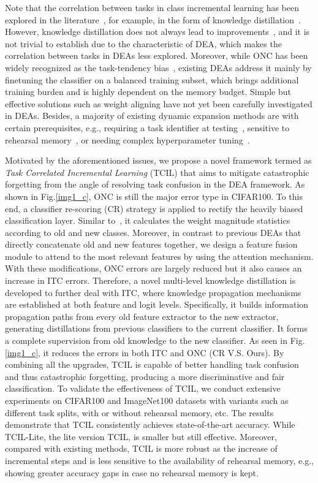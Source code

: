 \documentclass[letterpaper]{article} \usepackage{aaai23}  \usepackage{times}  \usepackage{helvet}  \usepackage{courier}  \usepackage[hyphens]{url}  \usepackage{graphicx} \urlstyle{rm} \def\UrlFont{\rm}  \usepackage{natbib}  \usepackage{caption} \frenchspacing  \setlength{\pdfpagewidth}{8.5in}  \setlength{\pdfpageheight}{11in}  \usepackage{algorithm}
\begin{document}
Note that the correlation between tasks in class incremental learning has been explored in the literature~\cite{v0, t69, t32}, for example, in the form of knowledge distillation~\cite{w20, t54, t19, min2020multi}. However, knowledge distillation does not always lead to improvements~\cite{v0, v25}, and it is not trivial to establish due to the characteristic of DEA, which makes the correlation between tasks in DEAs less explored. Moreover, while ONC has been widely recognized as the task-tendency bias~\cite{v25, t69, d39}, existing DEAs address it mainly by finetuning the classifier on a balanced training subset, which brings additional training burden and is highly dependent on the memory budget. Simple but effective solutions such as weight aligning \cite{d39} have not yet been carefully investigated in DEAs. Besides, a majority of existing dynamic expansion methods are with certain prerequisites, e.g., requiring a task identifier at testing~\cite{t23, t33, t67}, sensitive to rehearsal memory~\cite{t70}, or needing complex hyperparameter tuning~\cite{t70}. 



Motivated by the aforementioned issues, we propose a novel framework termed as \emph{Task Correlated Incremental Learning} (TCIL) that aims to mitigate catastrophic forgetting from the angle of resolving task confusion in the DEA framework. As shown in Fig.\ref{img1_c}, ONC is still the major error type in CIFAR100. To this end, a classifier re-scoring (CR) strategy is applied to rectify the heavily biased classification layer. Similar to~\cite{d39}, it calculates the weight magnitude statistics according to old and new classes. Moreover, in contrast to previous DEAs that directly concatenate old and new features together, we design a feature fusion module to attend to the most relevant features by using the attention mechanism. With these modifications, ONC errors are largely reduced but it also causes an increase in ITC errors. Therefore, a novel multi-level knowledge distillation is developed to further deal with ITC, where knowledge propagation mechanisms are established at both feature and logit levels. Specifically, it builds information propagation paths from every old feature extractor to the new extractor, generating distillations from previous classifiers to the current classifier. It forms a complete supervision from old knowledge to the new classifier. As seen in Fig.\ref{img1_c}, it reduces the errors in both ITC and ONC (CR V.S. Ours). By combining all the upgrades, TCIL is capable of better handling task confusion and thus catastrophic forgetting, producing a more discriminative and fair classification. To validate the effectiveness of TCIL, we conduct extensive experiments on CIFAR100 and ImageNet100 datasets with variants such as different task splits, with or without rehearsal memory, etc. The results demonstrate that TCIL consistently achieves state-of-the-art accuracy. While TCIL-Lite, the lite version TCIL, is smaller but still effective. Moreover, compared with existing methods, TCIL is more robust as the increase of incremental steps and is less sensitive to the availability of rehearsal memory, e.g., showing greater accuracy gaps in case no rehearsal memory is kept.
\end{document}
